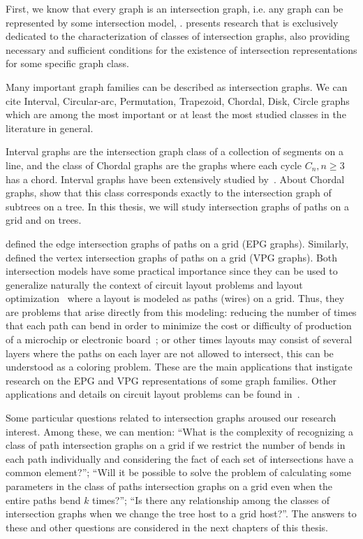  First, we know that every graph is an intersection graph, i.e. any graph can be represented by some intersection model, \cite{szpilrajn1945translation, erdos1966representation}. \citet{scheinerman1985characterizing} presents  research that is exclusively dedicated to the characterization of classes of intersection graphs, also providing necessary and sufficient conditions for the existence of intersection representations for some specific graph class.


Many important graph families can be described as intersection graphs. We can cite Interval, Circular-arc, Permutation, Trapezoid, Chordal,
Disk, Circle graphs which are among the most important or at least the most studied classes in the literature in general. 

Interval graphs are the intersection graph class of a collection of segments on a line, and the class of Chordal graphs are the graphs where each cycle $C_n, n\geq 3$ has a chord. Interval graphs have been extensively studied by~\cite{lekkeikerker1962representation}. About Chordal graphs, \citet{gavril1974intersection} show that this class corresponds exactly to the intersection graph of subtrees on a tree. In this thesis, we will study intersection graphs of paths on a grid and on trees.

\citet{golumbic2009} defined the edge intersection graphs of paths on a grid (EPG graphs). Similarly, \cite{asinowski2011string, asinowski2012} defined the vertex intersection graphs of paths on a grid (VPG graphs).  Both intersection models have some practical importance since they can be used to generalize naturally the context of
circuit layout problems and layout optimization~\cite{sinden1966topology} where a layout is modeled
as paths (wires) on a grid. Thus, they are problems that arise directly from this modeling: reducing the number of times that each path can bend in order to minimize the cost or difficulty of production of a microchip or electronic board~\cite{bandy1990,molitor1991}; or  other times layouts may consist of several layers where the paths on each layer are not allowed to intersect, this can be understood as a coloring problem. These are the main applications that instigate research on the EPG and VPG representations of some graph families. Other applications and details on circuit layout problems can be found in~\cite{bandy1990, molitor1991, sinden1966topology}.

Some particular questions related to intersection graphs aroused our research interest. Among these, we can mention: ``What is the complexity of recognizing a class of path intersection graphs on a grid if we restrict the number of bends in each path individually and considering the fact of each set of intersections have a common element?''; ``Will it be possible to solve the problem of calculating some parameters in the class of paths intersection graphs on a grid  even when the entire paths bend $k$ times?''; ``Is there any relationship among the classes of intersection graphs when we change the tree host to a grid host?''. The answers to these and other questions are considered in the next chapters of this thesis.



